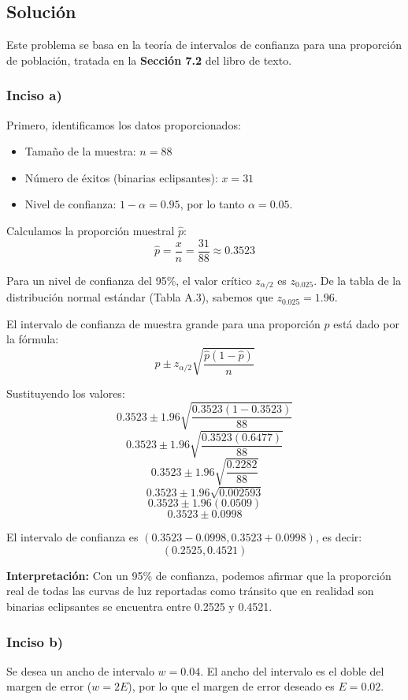 \documentclass[12pt]{article}
\begin{document}
\subsection{Solución}

Este problema se basa en la teoría de intervalos de confianza para una proporción de población, tratada en la \textbf{Sección 7.2} del libro de texto.

\subsubsection{Inciso a)}
Primero, identificamos los datos proporcionados:
\begin{itemize}
    \item Tamaño de la muestra: $n = 88$
    \item Número de éxitos (binarias eclipsantes): $x = 31$
    \item Nivel de confianza: $1 - \alpha = 0.95$, por lo tanto $\alpha = 0.05$.
\end{itemize}

Calculamos la proporción muestral $\hat{p}$:
$$ \hat{p} = \frac{x}{n} = \frac{31}{88} \approx 0.3523 $$

Para un nivel de confianza del 95\%, el valor crítico $z_{\alpha/2}$ es $z_{0.025}$. De la tabla de la distribución normal estándar (Tabla A.3), sabemos que $z_{0.025} = 1.96$.

El intervalo de confianza de muestra grande para una proporción $p$ está dado por la fórmula:
$$ \hat{p} \pm z_{\alpha/2} \sqrt{\frac{\hat{p}(1-\hat{p})}{n}} $$

Sustituyendo los valores:
$$ 0.3523 \pm 1.96 \sqrt{\frac{0.3523(1-0.3523)}{88}} $$
$$ 0.3523 \pm 1.96 \sqrt{\frac{0.3523(0.6477)}{88}} $$
$$ 0.3523 \pm 1.96 \sqrt{\frac{0.2282}{88}} $$
$$ 0.3523 \pm 1.96 \sqrt{0.002593} $$
$$ 0.3523 \pm 1.96 (0.0509) $$
$$ 0.3523 \pm 0.0998 $$

El intervalo de confianza es $(0.3523 - 0.0998, 0.3523 + 0.0998)$, es decir:
$$ (0.2525, 0.4521) $$

\textbf{Interpretación:} Con un 95\% de confianza, podemos afirmar que la proporción real de todas las curvas de luz reportadas como tránsito que en realidad son binarias eclipsantes se encuentra entre 0.2525 y 0.4521.

\subsubsection{Inciso b)}
Se desea un ancho de intervalo $w = 0.04$. El ancho del intervalo es el doble del margen de error ($w = 2E$), por lo que el margen de error deseado es $E = 0.02$.
\end{document}
